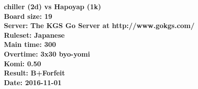 \documentclass{article}
\begin{document}
\begin{titlepage}
    \null
    \vfill
    \begin{center}
        \textbf{chiller (2d) vs Hapoyap (1k)}\\
        \textbf{Board size: 19}\\
        \textbf{Server: The KGS Go Server at http://www.gokgs.com/}\\
        \textbf{Ruleset: Japanese}\\
        \textbf{Main time: 300}\\
        \textbf{Overtime: 3x30 byo-yomi}\\
        \textbf{Komi: 0.50}\\
        \textbf{Result: B+Forfeit}\\
        \textbf{Date: 2016-11-01}
    \end{center}
    \vfill
\end{titlepage}
\newpage
\tableofcontents
\newpage
\end{document}
